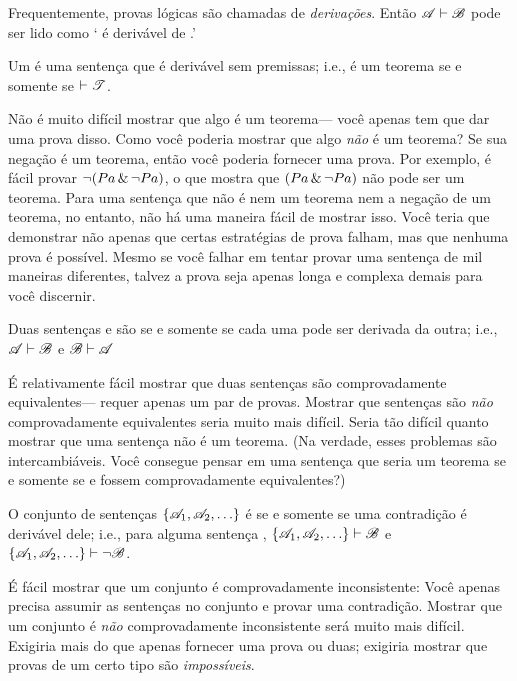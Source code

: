 Frequentemente, provas lógicas são chamadas de \emph{derivações}. Então $\mathscr{A}\vdash\mathscr{B}$ pode ser lido como ` é derivável de .'

Um  é uma sentença que é derivável sem premissas; i.e.,  é um teorema se e somente se $\vdash\mathscr{T}$.

Não é muito difícil mostrar que algo é um teorema--- você apenas tem que dar uma prova disso. Como você poderia mostrar que algo \emph{não} é um teorema? Se sua negação é um teorema, então você poderia fornecer uma prova. Por exemplo, é fácil provar $\neg(Pa \,\&\, \neg Pa)$, o que mostra que $(Pa \,\&\, \neg Pa)$ não pode ser um teorema. Para uma sentença que não é nem um teorema nem a negação de um teorema, no entanto, não há uma maneira fácil de mostrar isso. Você teria que demonstrar não apenas que certas estratégias de prova falham, mas que nenhuma prova é possível. Mesmo se você falhar em tentar provar uma sentença de mil maneiras diferentes, talvez a prova seja apenas longa e complexa demais para você discernir.

Duas sentenças  e  são  se e somente se cada uma pode ser derivada da outra; i.e., $\mathscr{A}\vdash\mathscr{B}$ e $\mathscr{B}\vdash\mathscr{A}$

É relativamente fácil mostrar que duas sentenças são comprovadamente equivalentes--- requer apenas um par de provas. Mostrar que sentenças são \emph{não} comprovadamente equivalentes seria muito mais difícil. Seria tão difícil quanto mostrar que uma sentença não é um teorema. (Na verdade, esses problemas são intercambiáveis. Você consegue pensar em uma sentença que seria um teorema se e somente se  e  fossem comprovadamente equivalentes?)

O conjunto de sentenças $\{\mathscr{A}_1,\mathscr{A}_2,\ldots\}$ é  se e somente se uma contradição é derivável dele; i.e., para alguma sentença , $\{\mathscr{A}_1,\mathscr{A}_2,\ldots\}\vdash\mathscr{B}$ e $\{\mathscr{A}_1,\mathscr{A}_2,\ldots\}\vdash\neg \mathscr{B}$.

É fácil mostrar que um conjunto é comprovadamente inconsistente: Você apenas precisa assumir as sentenças no conjunto e provar uma contradição. Mostrar que um conjunto é \emph{não} comprovadamente inconsistente será muito mais difícil. Exigiria mais do que apenas fornecer uma prova ou duas; exigiria mostrar que provas de um certo tipo são \emph{impossíveis}.








